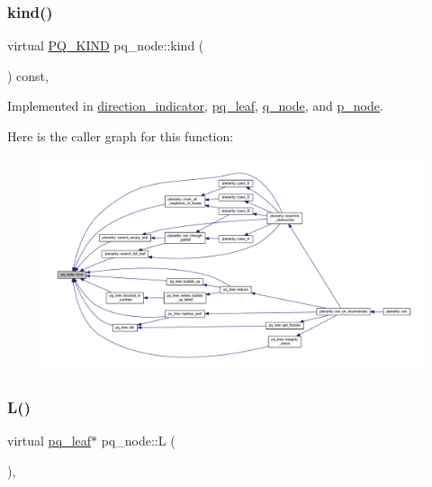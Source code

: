 \subsubsection{\texorpdfstring{kind()}{kind()}}
{\footnotesize\ttfamily virtual \mbox{\hyperlink{classpq__node_a96827bdca8bf81d20213405dd27f8fa6}{P\+Q\+\_\+\+K\+I\+ND}} pq\+\_\+node\+::kind (\begin{DoxyParamCaption}{ }\end{DoxyParamCaption}) const\hspace{0.3cm}{\ttfamily [protected]}, {}}



Implemented in \mbox{\hyperlink{classdirection__indicator_ab0ffeb761ec0d157b4c6ba13ece96d9b}{direction\+\_\+indicator}}, \mbox{\hyperlink{classpq__leaf_a31c4b7512aae53901bb20308fe3a8834}{pq\+\_\+leaf}}, \mbox{\hyperlink{classq__node_afcacf644da450a075d01b76803aa5da0}{q\+\_\+node}}, and \mbox{\hyperlink{classp__node_a58cceed9fc9d92f36ec3fb6425d99cec}{p\+\_\+node}}.

Here is the caller graph for this function\+:\nopagebreak
\begin{figure}[H]
\begin{center}
\leavevmode
\includegraphics[width=350pt]{classpq__node_aa9873c0cfad88bc4404857ce57d422e4_icgraph}
\end{center}
\end{figure}
\mbox{\label{classpq__node_a805b6ef48c847380b47c8ba882ed4ee2}} 
\subsubsection{\texorpdfstring{L()}{L()}}
{\footnotesize\ttfamily virtual \mbox{\hyperlink{classpq__leaf}{pq\+\_\+leaf}}$\ast$ pq\+\_\+node\+::L (\begin{DoxyParamCaption}{ }\end{DoxyParamCaption})\hspace{0.3cm}{\ttfamily [protected]}, {}}




